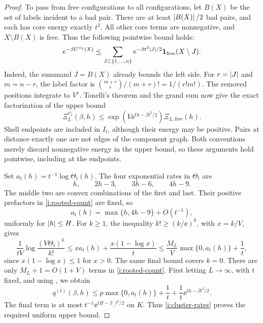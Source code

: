\begin{proof}
To pass from free configurations to all configurations, let \(B(X)\)
be the set of labels incident to a bad pair.  There are at least
\(\left|B(X)\right|/2\) bad pairs, and each has core energy exactly \(t^2\).
All other core terms are nonnegative, and \(X\setminus B(X)\) is free.
Thus the following pointwise bound holds:
\begin{equation}
 \mathrm e^{-\beta U^{\psi_t}(X)}
 \le\sum_{J\subset\{1,\ldots,n\}}
       \mathrm e^{-\beta t^2\left|J\right|/2}
       \mathbf 1_{\mathrm{free}}(X\setminus J).
 \label{i:removal-pointwise}
\end{equation}
Indeed, the summand \(J=B(X)\) already bounds the left side.
For \(r=\left|J\right|\) and \(m=n-r\), the label factor is
\(\binom{m+r}{r}/(m+r)!=1/(r!m!)\).  The removed positions integrate
to \(V^r\).  Tonelli's theorem and the grand sum now give the exact
factorization of the upper bound
\begin{equation}
 \Xi_L^{\psi_t}(\beta,h)
 \le
 \exp\!\left(V\ee^{th-\beta t^2/2}\right)
       \Xi_{L,\mathrm{free}}(h).
 \label{i:removal-factor}
\end{equation}
Shell endpoints are included in \(I_t\), although their energy may be
positive.  Pairs at distance exactly one are not edges of the component
graph.  Both conventions merely discard nonnegative energy in the upper
bound, so these arguments hold pointwise, including at the endpoints.

Set \(a_t(h)=t^{-1}\log\Theta_t(h)\).  The four exponential rates in
\(\Theta_t\) are
\[
 h,\qquad 2h-3,\qquad 3h-6,\qquad 4h-9.
\]
The middle two are convex combinations of the first and last.  Their
positive prefactors in \eqref{i:rooted-count} are fixed, so
\begin{equation}
 a_t(h)=\max\{h,4h-9\}+O(t^{-1}),
 \label{i:cluster-rates}
\end{equation}
uniformly for \(\left|h\right|\le H\).  For \(k\ge1\), the inequality
\(k!\ge(k/\ee)^k\), with \(x=k/V\), gives
\[
 \frac1{tV}\log\frac{(V\Theta_t)^k}{k!}
 \le x a_t(h)+\frac{x(1-\log x)}t
 \le \frac{M_L}{V}\max\{0,a_t(h)\}+\frac1t,
\]
since \(x(1-\log x)\le1\) for \(x>0\).  The same final bound covers
\(k=0\).  There are only \(M_L+1=O(1+V)\) terms in
\eqref{i:rooted-count}.  First letting \(L\to\infty\), with \(t\)
fixed, and using , we obtain
\begin{equation}
 q^{(t)}(\beta,h)
 \le p\max\{0,a_t(h)\}+\frac1t
       +\frac1t\ee^{th-\beta t^2/2}.
 \label{i:upper-pressure}
\end{equation}
The final term is at most
\(t^{-1}\ee^{tH-\beta_-t^2/2}\) on \(K\).  Thus
\eqref{i:cluster-rates} proves the required uniform upper bound.


\end{proof}
